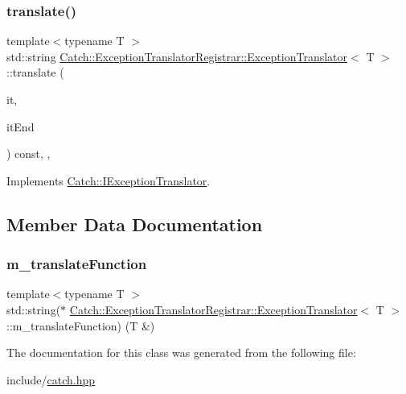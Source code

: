 \subsubsection{\texorpdfstring{translate()}{translate()}}
{\footnotesize\ttfamily template$<$typename T $>$ \\
std\+::string \mbox{\hyperlink{class_catch_1_1_exception_translator_registrar_1_1_exception_translator}{Catch\+::\+Exception\+Translator\+Registrar\+::\+Exception\+Translator}}$<$ T $>$\+::translate (\begin{DoxyParamCaption}\item[{Exception\+Translators\+::const\+\_\+iterator}]{it,  }\item[{Exception\+Translators\+::const\+\_\+iterator}]{it\+End }\end{DoxyParamCaption}) const\hspace{0.3cm}{\ttfamily [inline]}, {\ttfamily [override]}, {\ttfamily [virtual]}}



Implements \mbox{\hyperlink{struct_catch_1_1_i_exception_translator_a2a554b96ed5ed411e7c796b6b42837a5}{Catch\+::\+I\+Exception\+Translator}}.



\subsection{Member Data Documentation}
\mbox{\label{class_catch_1_1_exception_translator_registrar_1_1_exception_translator_a488013ff0869785c9d041443fbf9a757}} 
\subsubsection{\texorpdfstring{m\_translateFunction}{m\_translateFunction}}
{\footnotesize\ttfamily template$<$typename T $>$ \\
std\+::string($\ast$ \mbox{\hyperlink{class_catch_1_1_exception_translator_registrar_1_1_exception_translator}{Catch\+::\+Exception\+Translator\+Registrar\+::\+Exception\+Translator}}$<$ T $>$\+::m\+\_\+translate\+Function) (T \&)\hspace{0.3cm}{\ttfamily [protected]}}



The documentation for this class was generated from the following file\+:\begin{DoxyCompactItemize}
\item 
include/\mbox{\hyperlink{catch_8hpp}{catch.\+hpp}}\end{DoxyCompactItemize}
